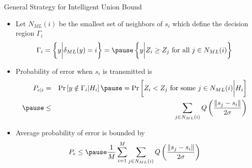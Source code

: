 \documentclass[t]{beamer}
\begin{document}
\begin{frame}{General Strategy for Intelligent Union Bound}
  \footnotesize
  \begin{itemize}
    \item \pause Let $N_{ML}(i)$ be the smallest set of neighbors of $s_i$ which define the decision region $\Gamma_i$
      \begin{eqnarray*}
        \Gamma_i = \left\{y \bigg| \delta_{ML}(y) = i\right\} = \pause \left\{y \bigg| Z_i \geq Z_j \text{ for all } j \in N_{ML}(i)\right\}
      \end{eqnarray*}
    \item \pause Probability of error when $s_i$ is transmitted is
      \begin{eqnarray*}
        P_{e|i} & = & \Pr\left[y \notin \Gamma_i | H_i\right] \pause = \Pr\left[Z_i < Z_j \text{ for some } j \in N_{ML}(i) \bigg| H_i\right] \\ \pause
                & \leq & \sum_{j \in N_{ML}(i)} Q\left(\frac{\lVert s_j - s_i \rVert}{2\sigma} \right)
      \end{eqnarray*}
    \item \pause Average probability of error is bounded by
      \begin{eqnarray*}
        P_e \leq \pause \frac{1}{M}\sum_{i=1}^M \sum_{j \in N_{ML}(i)} Q\left(\frac{\lVert s_j - s_i \rVert}{2\sigma} \right)
      \end{eqnarray*}
  \end{itemize}
  \normalsize
\end{frame}
\end{document}
